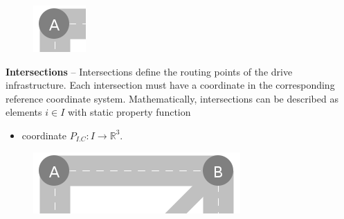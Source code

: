 \documentclass[graybox]{svmult}
\begin{document}
\vspace{4mm}

\begin{figure}
	\centering
		\includegraphics[scale=0.5]{../../concepts/intersection.png}
\end{figure}

\noindent
\textbf{Intersections}
--
Intersections define the routing points of the drive infrastructure.
Each intersection must have a coordinate in the corresponding reference coordinate system.
Mathematically, intersections can be described as elements $i \in I$ with static property function
\begin{itemize}
	\item coordinate $P_{I.C}: I \rightarrow \mathbb{R}^3$.
\end{itemize}
\vspace{2mm}

\begin{figure}
	\centering
		\includegraphics[scale=0.4]{../../concepts/segment.png}
\end{figure}
\end{document}
